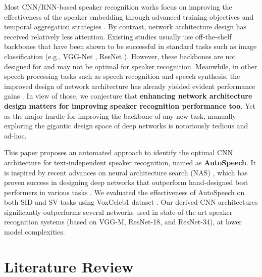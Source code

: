 \documentclass[a4paper]{article}
\begin{document}
Most CNN/RNN-based speaker recognition works focus on improving the effectiveness of the speaker embedding through advanced training objectives and temporal aggregation strategies \cite{gao2019improving, hajibabaei2018unified, xie2019utterance, cai2018exploring, li2017deep}. By contrast, network architecture design has received relatively less attention. Existing studies usually use off-the-shelf backbones that have been shown to be successful in standard tasks such as image classification (e.g., VGG-Net \cite{simonyan2014very}, ResNet \cite{he2016deep}). However, these backbones are not designed for and may not be optimal for speaker recognition. Meanwhile, in other speech processing tasks such as speech recognition and speech synthesis, the improved design of network architecture has already yielded evident performance gains \cite{chan2016listen, shen2018natural}. In view of those, we conjecture that \textbf{enhancing network architecture design matters for improving speaker recognition performance too}. Yet as the major hurdle for improving the backbone of any new task, manually exploring the gigantic design space of deep networks is notoriously tedious and ad-hoc. 



This paper proposes an automated approach to identify the optimal CNN architecture for text-independent speaker recognition, named as \textbf{AutoSpeech}. It is inspired by recent advances on neural architecture search (NAS) \cite{liu2018darts, real2019regularized, pham2018efficient, zoph2016neural, negrinho2017deeparchitect}, which has proven success in designing deep networks that outperform hand-designed best performers in various tasks \cite{baruwa2019leveraging, liu2019auto, gong2019autogan, quan2019auto}. 
We evaluated the effectiveness of AutoSpeech on both SID and SV tasks using VoxCeleb1 dataset \cite{nagrani2017voxceleb}. Our derived CNN architectures significantly outperforms several networks used in state-of-the-art speaker recognition systems (based on VGG-M, ResNet-18, and ResNet-34), at lower model complexities.



\section{Literature Review}
\label{sec:literature}
\end{document}
